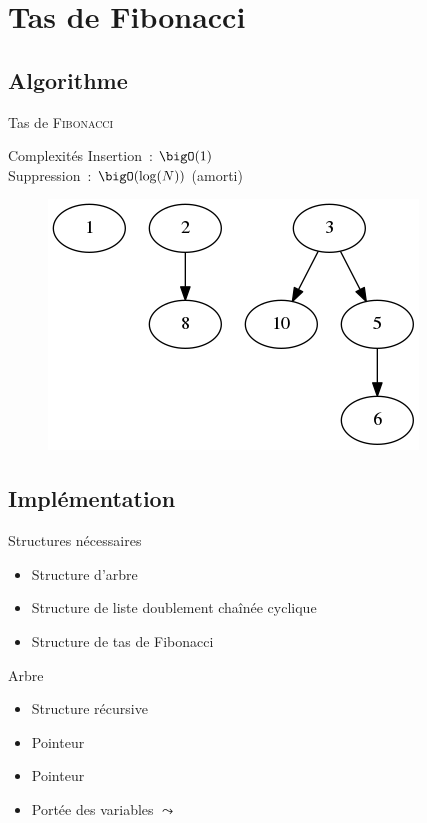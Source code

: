 \documentclass[11pt]{beamer}
\begin{document}
\section{Tas de Fibonacci}

\subsection{Algorithme}

\begin{frame}{Tas de \textsc{Fibonacci}}
\begin{block}{Complexités}
Insertion~: $\bigO(1)$\\
Suppression~: $\bigO(\log(N))$ (amorti)
\end{block}

\vspace{1em}
\begin{figure}[H]
\includegraphics[width=0.6\linewidth]{fiboheap.png}
\end{figure}
\end{frame}

\subsection{Implémentation}

\begin{frame}{Structures nécessaires}
\begin{itemize}
\item Structure d'\alert{arbre}
\item Structure de \alert{liste doublement chaînée cyclique}
\item Structure de \alert{tas de Fibonacci}
\end{itemize}
\end{frame}

\begin{frame}{Arbre}
\begin{itemize}
\item Structure récursive
\item Pointeur 
\item Pointeur 
\item Portée des variables $\leadsto$ 
\end{itemize}
\end{frame}
\end{document}
